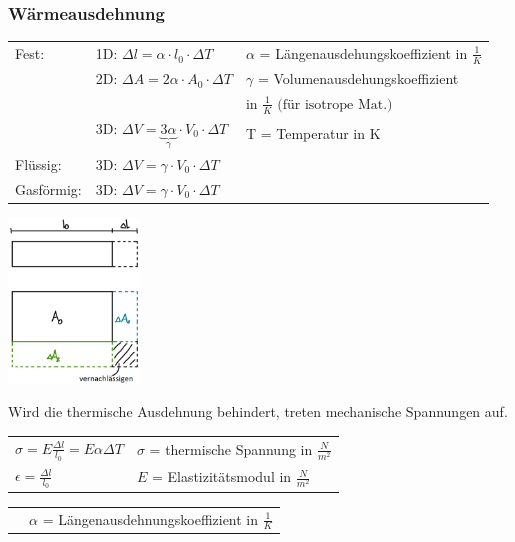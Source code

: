 	\subsubsection{Wärmeausdehnung}
		\begin{minipage}{14cm}
			\newline
				\begin{tabular}{ p{1.5cm} p{4.5cm} | p{7.5cm} }
					Fest:
					& 1D: $\Delta l = \alpha \cdot l_0 \cdot \Delta T $
						& $\alpha$ = Längenausdehungskoeffizient in $\frac{1}{K}$\\
					& 2D: $\Delta A = 2\alpha \cdot A_0 \cdot \Delta T$
						& $\gamma$ = Volumenausdehungskoeffizient\\
						&& \quad \quad in $\frac{1}{K} \text{ (für isotrope Mat.)}$\\
					& 3D: $\Delta V = \underbrace{3\alpha}_{\gamma} \cdot V_0 \cdot \Delta T$
						& T = Temperatur in K\\
					Flüssig:
					& 3D: $\Delta V = \gamma \cdot V_0 \cdot \Delta T$\\
					Gasförmig:
						& 3D: $\Delta V = \gamma \cdot V_0 \cdot \Delta T$\\
				\end{tabular} 
		\end{minipage}
		\begin{minipage}{10cm}
			\includegraphics[width=3.5cm]{./bilder/Waermeausdehnung.png}
		\end{minipage}
		\begin{minipage}[t]{13cm}
			\begin{flushleft}
				Wird die thermische Ausdehnung behindert, treten mechanische Spannungen auf.
			\end{flushleft}
			\renewcommand{\arraystretch}{2}
			\begin{tabular}{ p{4cm} | p{7cm}}
				$\sigma = E \frac{\Delta l}{l_0} = E \alpha \Delta T$	&	$\sigma$ = thermische Spannung in $\frac{N}{m^2}$\\
				$\epsilon = \frac{\Delta l}{l_0}$	& $E$ = Elastizitätsmodul in $\frac{N}{m^2}$\\
			\end{tabular}
			\renewcommand{\arraystretch}{1.5}
			\begin{tabular}{ p{4cm} | p{7cm} }
				& $\alpha$ = Längenausdehnungskoeffizient in $\frac{1}{K}$\\
			\end{tabular} 
			\renewcommand{\arraystretch}{1}
		\end{minipage}

